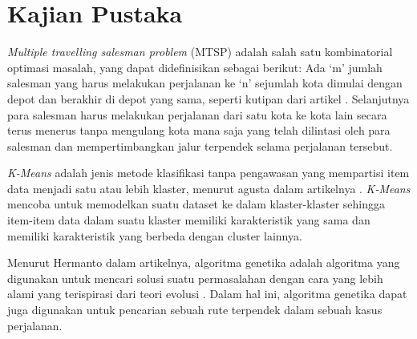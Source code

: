\section{Kajian Pustaka}

\textit{Multiple travelling salesman problem} (MTSP) adalah salah satu kombinatorial optimasi masalah, yang dapat didefinisikan sebagai berikut: Ada `m' jumlah salesman yang harus melakukan perjalanan ke `n' sejumlah kota dimulai dengan depot dan berakhir di depot yang sama, seperti kutipan dari artikel \cite{al2019comparative}. Selanjutnya para salesman harus melakukan perjalanan dari satu kota ke kota lain secara terus menerus tanpa mengulang kota mana saja yang telah dilintasi oleh para salesman dan mempertimbangkan jalur terpendek selama perjalanan tersebut.

\textit{K-Means} adalah jenis metode klasifikasi tanpa pengawasan yang mempartisi item data menjadi satu atau lebih klaster, menurut agusta dalam artikelnya \cite{agusta2007k}. \textit{K-Means} mencoba untuk memodelkan suatu dataset ke dalam klaster-klaster sehingga item-item data dalam suatu klaster memiliki karakteristik yang sama dan memiliki karakteristik yang berbeda dengan cluster lainnya.

Menurut Hermanto dalam artikelnya, algoritma genetika adalah algoritma yang digunakan untuk mencari solusi suatu permasalahan dengan cara yang lebih alami yang terispirasi dari teori evolusi  \cite{hermawanto2003algoritma}. Dalam hal ini, algoritma genetika dapat juga digunakan untuk pencarian sebuah rute terpendek dalam sebuah kasus perjalanan.
